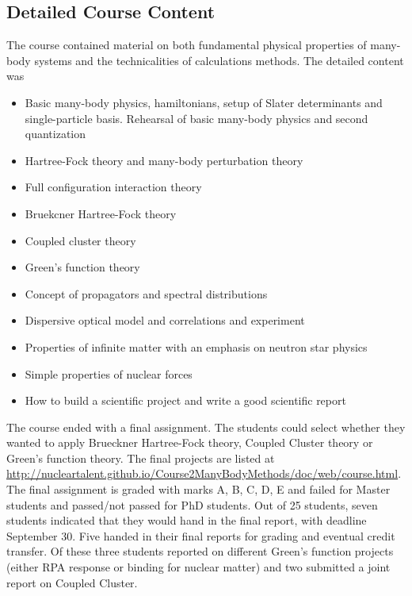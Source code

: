 \documentclass[prc,amsart,english]{revtex4}
\begin{document}
\subsection{Detailed Course Content}

The course contained material on both fundamental physical properties of many-body systems and the technicalities of calculations methods.
The detailed content was 
\begin{itemize}
\item Basic many-body physics, hamiltonians,
setup of Slater determinants and single-particle basis.
Rehearsal of basic many-body physics and second quantization
\item Hartree-Fock theory and many-body perturbation theory
\item Full configuration interaction theory
\item Bruekcner Hartree-Fock theory
\item Coupled cluster theory
\item Green's function theory
\item Concept of propagators and spectral distributions
\item Dispersive optical model and correlations and experiment
\item Properties of infinite matter with an emphasis on neutron star physics
\item Simple properties of nuclear forces
\item How to build a scientific project and write a good scientific report
\end{itemize}

The course ended with a final assignment. 
The students could select whether they wanted to apply Brueckner Hartree-Fock theory, Coupled Cluster theory or Green's function theory. The final projects
are listed at \url{http://nucleartalent.github.io/Course2ManyBodyMethods/doc/web/course.html}.
The final assignment  is graded
with marks A, B, C, D, E and failed for Master students and passed/not passed for PhD students.
Out of 25 students, seven students indicated that they would hand in the final report, with deadline September 30.  Five handed in their final reports for grading and eventual credit transfer. Of these three students reported on different Green's function projects (either RPA response or binding for nuclear matter) and two submitted a joint report on Coupled Cluster.
\end{document}
